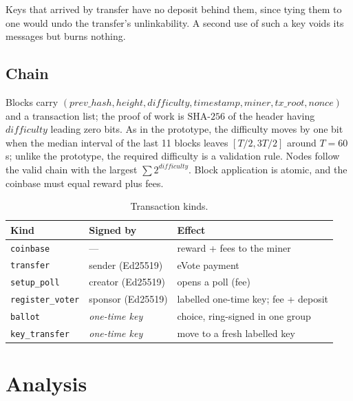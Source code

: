 \documentclass[11pt,a4paper]{article}
\theoremstyle{definition}
\begin{document}
Keys that arrived by transfer have no deposit behind them, since tying
them to one would undo the transfer's unlinkability. A second use of
such a key voids its messages but burns nothing.

\subsection{Chain}

Blocks carry $(\mathit{prev\_hash}, \mathit{height}, \mathit{difficulty},
\mathit{timestamp}, \mathit{miner}, \mathit{tx\_root}, \mathit{nonce})$
and a transaction list; the proof of work is $\mathrm{SHA\text{-}256}$ of
the header having $\mathit{difficulty}$ leading zero bits. As in the
prototype, the difficulty moves by one bit when the median interval of the
last 11 blocks leaves $[T/2, 3T/2]$ around $T = 60$\,s; unlike the
prototype, the required difficulty is a validation rule. Nodes follow the
valid chain with the largest $\sum 2^{\mathit{difficulty}}$. Block
application is atomic, and the coinbase must equal reward plus fees.

\begin{table}[h]
\centering
\caption{Transaction kinds.}
\label{tab:tx}
\small
\begin{tabular}{lll}
\toprule
Kind & Signed by & Effect \\
\midrule
\texttt{coinbase}        & ---           & reward + fees to the miner \\
\texttt{transfer}        & sender (Ed25519) & eVote payment \\
\texttt{setup\_poll}     & creator (Ed25519) & opens a poll (fee) \\
\texttt{register\_voter} & sponsor (Ed25519) & labelled one-time key; fee + deposit \\
\texttt{ballot}          & \emph{one-time key} & choice, ring-signed in one group \\
\texttt{key\_transfer}   & \emph{one-time key} & move to a fresh labelled key \\
\bottomrule
\end{tabular}
\end{table}

\section{Analysis}
\label{sec:analysis}
\end{document}
